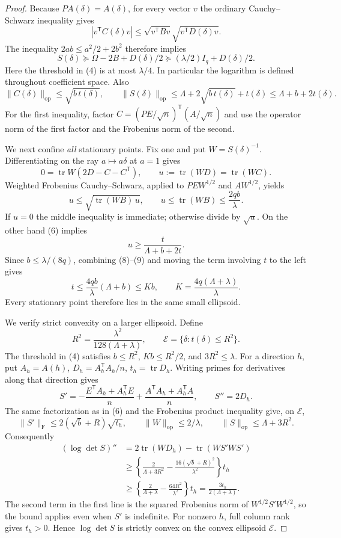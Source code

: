 \documentclass[11pt]{article}
\newcommand{\tr}{\operatorname{tr}}
\newcommand{\op}{\mathrm{op}}
\newcommand{\F}{\mathrm{F}}
\begin{document}
\begin{proof}
Because \(PA(\delta)=A(\delta)\), for every vector \(v\) the
ordinary Cauchy--Schwarz inequality gives
\[
 |v^{\mathsf T}C(\delta)v|
 \leq\sqrt{v^{\mathsf T}Bv}\sqrt{v^{\mathsf T}D(\delta)v}.
\]
The inequality \(2ab\leq a^2/2+2b^2\) therefore implies
\[
 S(\delta)\succeq\Omega-2B+D(\delta)/2
 \succeq (\lambda/2)I_q+D(\delta)/2.
 \tag{5}
\]
Here the threshold in (4) is at most \(\lambda/4\). In particular
the logarithm is defined throughout coefficient space. Also
\[
 \|C(\delta)\|_{\op}\leq\sqrt{b\,t(\delta)},\qquad
 \|S(\delta)\|_{\op}
 \leq\Lambda+2\sqrt{b\,t(\delta)}+t(\delta)
 \leq\Lambda+b+2t(\delta).
 \tag{6}
\]
For the first inequality, factor \(C=(PE/\sqrt n)^{\mathsf T}
(A/\sqrt n)\) and use the operator norm of the first factor and
the Frobenius norm of the second.

We next confine \emph{all} stationary points. Fix one and put
\(W=S(\delta)^{-1}\). Differentiating on the ray
\(a\mapsto a\delta\) at \(a=1\) gives
\[
 0=\tr W(2D-C-C^{\mathsf T}),\qquad
 u:=\tr(WD)=\tr(WC).
 \tag{7}
\]
Weighted Frobenius Cauchy--Schwarz, applied to \(PEW^{1/2}\)
and \(AW^{1/2}\), yields
\[
 u\leq\sqrt{\tr(WB)\,u},\qquad
 u\leq\tr(WB)\leq\frac{2qb}{\lambda}.
 \tag{8}
\]
If \(u=0\) the middle inequality is immediate; otherwise divide
by \(\sqrt u\). On the other hand (6) implies
\[
 u\geq\frac{t}{\Lambda+b+2t}.
 \tag{9}
\]
Since \(b\leq\lambda/(8q)\), combining (8)--(9) and moving
the term involving \(t\) to the left gives
\[
 t\leq \frac{4qb}{\lambda}(\Lambda+b)
 \leq Kb,\qquad K=\frac{4q(\Lambda+\lambda)}{\lambda}.
 \tag{10}
\]
Every stationary point therefore lies in the same small ellipsoid.

We verify strict convexity on a larger ellipsoid. Define
\[
 R^2=\frac{\lambda^2}{128(\Lambda+\lambda)},\qquad
 \mathcal E=\{\delta:t(\delta)\leq R^2\}.
 \tag{11}
\]
The threshold in (4) satisfies \(b\leq R^2\),
\(Kb\leq R^2/2\), and \(3R^2\leq\lambda\).
For a direction \(h\), put \(A_h=A(h)\),
\(D_h=A_h^{\mathsf T}A_h/n\), \(t_h=\tr D_h\).
Writing primes for derivatives along that direction gives
\[
 S'=-\frac{E^{\mathsf T}A_h+A_h^{\mathsf T}E}{n}
       +\frac{A^{\mathsf T}A_h+A_h^{\mathsf T}A}{n},
 \qquad S''=2D_h.
 \tag{12}
\]
The same factorization as in (6) and the Frobenius product
inequality give, on \(\mathcal E\),
\[
 \|S'\|_{\F}\leq 2(\sqrt b+R)\sqrt{t_h},\qquad
 \|W\|_{\op}\leq2/\lambda,\qquad
 \|S\|_{\op}\leq\Lambda+3R^2.
 \tag{13}
\]
Consequently
\begin{align*}
 (\log\det S)''
 &=2\tr(WD_h)-\tr(WS'WS')\\
 &\geq\left\{\frac{2}{\Lambda+3R^2}
             -\frac{16(\sqrt b+R)^2}{\lambda^2}\right\}t_h\\
 &\geq\left\{\frac{2}{\Lambda+\lambda}
             -\frac{64R^2}{\lambda^2}\right\}t_h
 =\frac{3t_h}{2(\Lambda+\lambda)}.
 \tag{14}
\end{align*}
The second term in the first line is the squared Frobenius norm
of \(W^{1/2}S'W^{1/2}\), so the bound applies even when \(S'\)
is indefinite. For nonzero \(h\), full column rank gives
\(t_h>0\). Hence \(\log\det S\) is strictly convex on the
convex ellipsoid \(\mathcal E\).


\end{proof}
\end{document}
